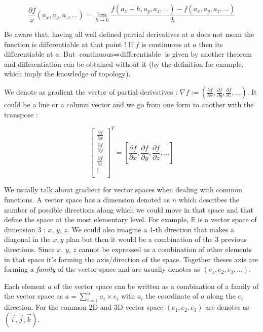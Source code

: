 \documentclass[12pt]{article}
\begin{document}
$$
\frac{\partial{f}}{x}(a_x, a_y, a_z, ...) = \lim_{ h \to 0} \frac{f(a_x+h, a_y, a_z, ...)-f(a_x, a_y, a_z, ...)}{h}
$$

Be aware that, having all well defined partial derivatives at $a$ does not mean the function is differentiable at that point ! If $f$ is continuous at $a$ then its differentiable at $a$. But $\text{continuous} \Rightarrow \text{differentiable}$ is given by another theorem and differentiation can be obtained without it (by the definition \cite{wiki_differentiable_function} for example, which imply the knowledge of topology).

We denote as gradient \cite{wiki_gradient} the vector of partial derivatives : $ \nabla f := (\frac{\partial{f}}{\partial{x}}, \frac{\partial{f}}{\partial{y}}, \frac{\partial{f}}{\partial{z}},...)$. It could be a line or a column vector and we go from one form to another with the transpose \cite{wiki_transpose} : 

$$
\begin{bmatrix}
    \frac{\partial{f}}{\partial{x}} \\
    \frac{\partial{f}}{\partial{y}} \\
    \frac{\partial{f}}{\partial{z}} \\
    \vdots \\
\end{bmatrix}^T = [\frac{\partial{f}}{\partial{x}}, \frac{\partial{f}}{\partial{y}}, \frac{\partial{f}}{\partial{z}},...]
$$

We usually talk about gradient for vector spaces \cite{wiki_vector_space} when dealing with common functions. A vector space has a dimension denoted as $n$ which describes the number of possible directions along which we could move in that space and that define the space at the most elementary level. For example, $\mathbb{R}$ is a vector space of dimension 3 : $x$, $y$, $z$. We could also imagine a 4-th direction that makes a diagonal in the $x,y$ plan but then it would be a combination of the 3 previous directions. Since $x$, $y$, $z$ cannot be expressed as a combination of other elements in that space it's forming the axis/direction of the space. Together theses axis are forming a {\it family} of the vector space and are usually denotes as $(e_1, e_2, e_3, ...)$. 

Each element $a$ of the vector space can be written as a combination of a family of the vector space as $a = \sum_{i=1}^{n} a_i \times e_i$ with $a_i$ the coordinate of $a$ along the $e_i$ direction. For the common 2D and 3D vector space $(e_1, e_2, e_3)$ are denotes as $(\vec{i}, \vec{j}, \vec{k})$.
\end{document}
